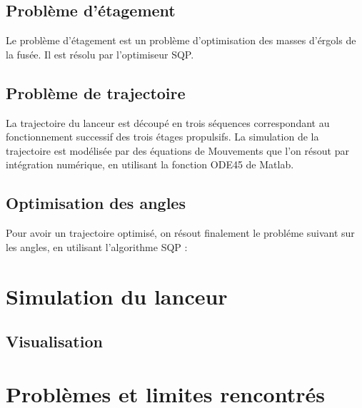 \documentclass[a4paper,20pt]{article}
\begin{document}
\subsection{Probl\`eme d'\'etagement}

Le probl\`eme d'\'etagement est un probl\`eme d'optimisation des masses d'\'ergols de la fus\'ee.
Il est r\'esolu par l'optimiseur SQP.


\subsection{Probl\`eme de trajectoire}

La trajectoire du lanceur est d\'ecoup\'e en trois s\'equences correspondant au fonctionnement successif des trois \'etages propulsifs.
La simulation de la trajectoire est mod\'elis\'ee par des \'equations de Mouvements que l'on r\'esout par int\'egration num\'erique, en utilisant la fonction ODE45 de Matlab.

\subsection{Optimisation des angles}

 Pour avoir un trajectoire optimis\'e, on r\'esout finalement le probl\'eme suivant sur les angles, en utilisant l'algorithme SQP :

\section{Simulation du lanceur}
\subsection{Visualisation}

\section{Probl\`emes et limites rencontr\'es}
\end{document}
